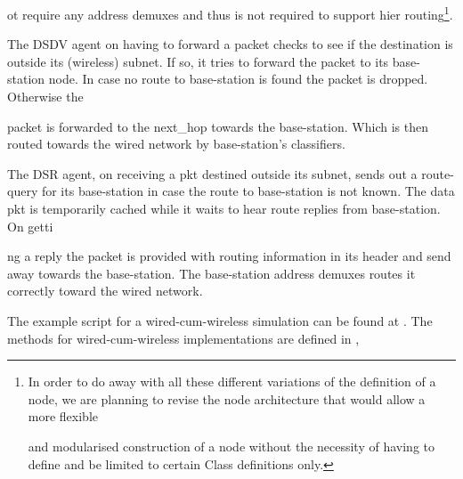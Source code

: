 {ot require any address demuxes and thus is not required to support hier routing\footnote{In order to do away with all these different variations of the definition of a node, we are planning to revise the node architecture that would allow a more flexible 











and modularised construction of a node without the necessity of having to define and be limited to certain Class definitions only.}.

The DSDV agent on having to forward a packet checks to see if the destination is outside its (wireless) subnet. If so, it tries to forward the packet to its base-station node. In case no route to base-station is found the packet is dropped. Otherwise the 











packet is forwarded to the next\_hop towards the base-station. Which is then routed towards the wired network by base-station's classifiers.

The DSR agent, on receiving a pkt destined outside its subnet, sends out a route-query for its base-station in case the route to base-station is not known. The data pkt is temporarily cached while it waits to hear route replies from base-station. On getti











ng a reply the packet is provided with routing information in its header and send away towards the base-station. The base-station address demuxes routes it correctly toward the wired network. 

The example script for a wired-cum-wireless simulation can be found at . The methods for wired-cum-wireless implementations are defined in , 











}

